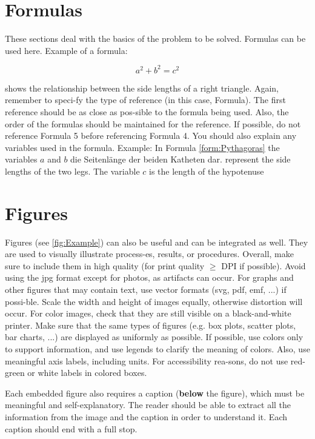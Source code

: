 \documentclass[12pt]{report}           %
\theoremstyle{thesis}        %
\begin{document}
	\section{Formulas}
	These sections deal with the basics of the problem to be solved. Formulas can be used here. Example of a formula:
	
	\begin{equation}
		a^2+b^2=c^2\label{form:Pythagoras}
	\end{equation}
	
shows the relationship between the side lengths of a right triangle. Again, remember to speci-fy the type of reference (in this case, Formula). The first reference should be as close as pos-sible to the formula being used. Also, the order of the formulas should be maintained for the reference. If possible, do not reference Formula 5 before referencing Formula 4. You should also explain any variables used in the formula. Example: In Formula \ref{form:Pythagoras} the variables $a$ and $b$ die Seitenlänge der beiden Katheten dar. represent the side lengths of the two legs. The variable $c$ is the length of the hypotenuse
	\section{Figures}
	
	Figures (see \autoref{fig:Example}) can also be useful and can be integrated as well. They are used to visually illustrate process-es, results, or procedures. Overall, make sure to include them in high quality (for print quality $\geq$ DPI if possible). Avoid using the jpg format except for photos, as artifacts can occur. For graphs and other figures that may contain text, use vector formats (svg, pdf, emf, ...) if possi-ble. Scale the width and height of images equally, otherwise distortion will occur. For color images, check that they are still visible on a black-and-white printer. Make sure that the same types of figures (e.g. box plots, scatter plots, bar charts, ...) are displayed as uniformly as possible. If possible, use colors only to support information, and use legends to clarify the meaning of colors. Also, use meaningful axis labels, including units. For accessibility rea-sons, do not use red-green or white labels in colored boxes. 
	
Each embedded figure also requires a caption ({\bf below} the figure), which must be meaningful and self-explanatory. The reader should be able to extract all the information from the image and the caption in order to understand it. Each caption should end with a full stop.
	
\end{document}
